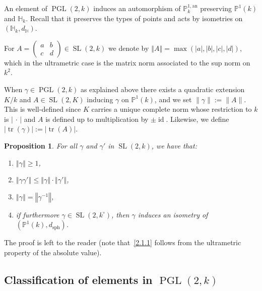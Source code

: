 \documentclass[11pt]{article}
\newtheorem{prop}[theo]{Proposition}
\theoremstyle{definition}
\numberwithin{equation}{section}
\numberwithin{figure}{section}
\numberwithin{table}{section}
\DeclareMathOperator{\tr}{tr}
\DeclareMathOperator{\id}{id}
\DeclareMathOperator{\sph}{sph}
\DeclareMathOperator{\SL}{SL}
\DeclareMathOperator{\PGL}{PGL}
\newcommand{\hh}{\mathbb{H}}
\newcommand{\norm}[1]{\left\Vert#1\right\Vert}
\newcommand{\abs}[1]{\left\vert#1\right\vert}
\newcommand{\pu}{{\mathbb{P}^1}}
\newcommand{\PP}{\mathbb{P}}
\newcommand{\berk}{{\mathbb{P}^{1, \mathrm{an}}_k}}
\newcommand{\lrpar}[1]{\left(#1\right)}
\newcommand{\SLk}{\SL(2,k)}
\newcommand{\PGLk}{\PGL(2, k)}
\newcommand{\inv}{^{-1}}
\newcommand*{\romanenumi}{\renewcommand*{\theenumi}{\roman{enumi}}}
\begin{document}
An element of $\PGLk$ induces an automorphism of $\berk$ preserving $\pu(k)$ and $\hh_k$. Recall that it preserves the types of points and acts by isometries on $(\hh_k,d_\hh)$.

For $A = \lrpar{\begin{smallmatrix} a & b \\ c & d
\end{smallmatrix}} \in \SLk$ we denote by
$\norm{A} = \max\lrpar{\abs{a}, \abs{b}, \abs{c}, \abs{d}}$, which in the ultrametric case is the matrix norm associated to the sup norm on $ k^2$.

When $\gamma \in \PGL(2,k)$ as explained above there exists a quadratic extension $K/k$ and $A \in \SL(2,K)$ inducing $\gamma$ on $\PP^1(k)$, and we set $\| \gamma \| := \| A\|$. This is well-defined since $K$ carries a unique complete norm whose restriction to $k$ is $|{\,\cdot\,}|$ and $A$ is defined up to multiplication by $\pm \id$. Likewise, we define $\abs{\tr(\gamma)} := \abs{\tr(A)}$.

\begin{prop}
For all $\gamma$ and $\gamma' $ in $\SLk$, we have that:
\begin{enumerate}%
\item \label{2.1.1} $\norm{\gamma}\geq 1$,
\item \label{2.1.2} $\norm{\gamma \gamma'}\leq \norm{\gamma}\cdot\norm{\gamma'}$,
\item \label{2.1.3} $\norm{\gamma} = \norm{\gamma\inv}$,
\item \label{2.1.4} if furthermore $\gamma\in \SL(2,k^\circ)$, then $\gamma$ induces an isometry of $(\PP^1(k),d_{\sph})$.
\end{enumerate}
\end{prop}

The proof is left to the reader (note that~\eqref{2.1.1} follows from the ultrametric property of the absolute value).


\subsection{Classification of elements in \texorpdfstring{$\PGL(2,k)$}{PGL(2,k)}}
\end{document}
